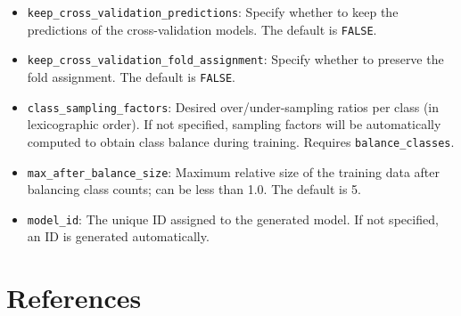 \begin{itemize}
\item {\texttt{keep\_cross\_validation\_predictions}}: Specify whether to keep the predictions of the cross-validation models.   The default is {\texttt{FALSE}}.
\item {\texttt{keep\_cross\_validation\_fold\_assignment}}: Specify whether to preserve the fold assignment.   The default is {\texttt{FALSE}}.
\item {\texttt{class\_sampling\_factors}}: Desired over/under-sampling ratios per class (in lexicographic order). If not specified, sampling factors will be automatically computed to obtain class balance during training. Requires \texttt{balance\_classes}.
\item {\texttt{max\_after\_balance\_size}}: Maximum relative size of the training data after balancing class counts; can be less than 1.0.  The default is 5.
\item \texttt{model\_id}: The unique ID assigned to the generated model. If not specified, an ID is generated automatically.
\end{itemize}

\newpage
\section{References}

















